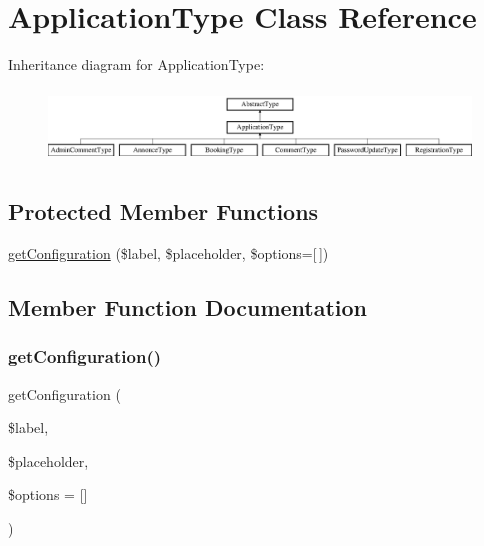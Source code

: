 \hypertarget{class_app_1_1_form_1_1_application_type}{}\section{Application\+Type Class Reference}
\label{class_app_1_1_form_1_1_application_type}
Inheritance diagram for Application\+Type\+:\begin{figure}[H]
\begin{center}
\leavevmode
\includegraphics[height=1.971831cm]{class_app_1_1_form_1_1_application_type}
\end{center}
\end{figure}
\subsection*{Protected Member Functions}
\begin{DoxyCompactItemize}
\item 
\mbox{\hyperlink{class_app_1_1_form_1_1_application_type_afc57049ac3d7fc1a91bd87bc48c5e25b}{get\+Configuration}} (\$label, \$placeholder, \$options=\mbox{[}$\,$\mbox{]})
\end{DoxyCompactItemize}


\subsection{Member Function Documentation}
\mbox{\label{class_app_1_1_form_1_1_application_type_afc57049ac3d7fc1a91bd87bc48c5e25b}} 
\subsubsection{\texorpdfstring{getConfiguration()}{getConfiguration()}}
{\footnotesize\ttfamily get\+Configuration (\begin{DoxyParamCaption}\item[{}]{\$label,  }\item[{}]{\$placeholder,  }\item[{}]{\$options = {\ttfamily \mbox{[}\mbox{]}} }\end{DoxyParamCaption})\hspace{0.3cm}{\ttfamily [protected]}}

